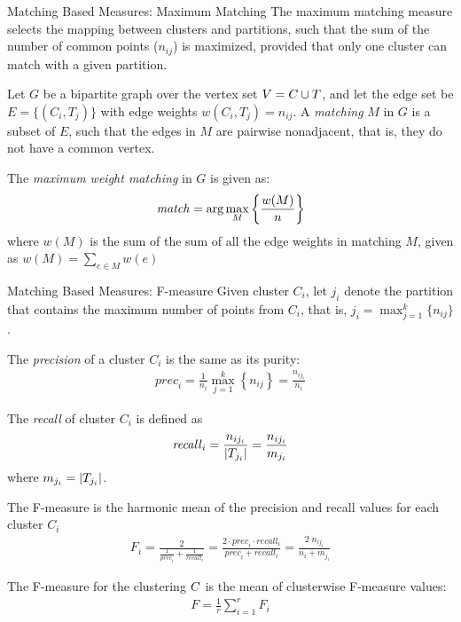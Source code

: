 \begin{frame}{Matching Based Measures: Maximum Matching}
The maximum matching
measure selects the mapping between clusters and partitions, such
that the sum of the number of common points ($n_{ij}$) is
maximized, provided that only one cluster can match with a given
partition.

\medskip
Let $G$ be a bipartite graph over the vertex set $V = {\relax C} \cup {\relax T}$, and
let the edge set be $E = \{ (C_i, T_{j}) \}$ with 
edge weights $w(C_i,T_{j}) = n_{ij}$.
A {\em matching} $M$ in $G$ is a subset of $E$, such that the edges in
$M$ are pairwise nonadjacent, that is, they do not have a common vertex.

\medskip
The {\em maximum weight matching} in $G$ is given as:
\begin{align*}
  \mathit{match} = \arg \max_M \left\{ \frac{w(M)}{n} \right\}
\end{align*}
where $w(M)$ is the sum of the sum of
all the edge weights in matching $M$, given as $w(M) = \sum_{e \in M} w(e)$
\end{frame}




\begin{frame}{Matching Based Measures: F-measure}
  \small
Given cluster $C_i$, let $j_i$ denote the
partition that contains the maximum number of points from $C_i$,
that is, $j_i = \max_{j=1}^k \{ n_{ij} \}$.  

\medskip
The {\em precision} of a
cluster $C_i$ is the same as its purity:
\begin{align*}
  \mathit{prec}_i = \frac{1}{n_{i}}\max_{j=1}^k \left\{ n_{ij} \right\} =
  \frac{n_{ij_i}}{n_i}
\end{align*}

\medskip
The {\em recall} of cluster $C_i$ is def\/{i}ned as
\begin{align*}
  \mathit{recall}_i = \frac{n_{ij_i}}{|T_{j_i}|} =\frac{n_{ij_i}}{m_{j_i}}
 \end{align*}
 where $m_{j_i} = |T_{j_i}|$.

\medskip
The F-measure is the harmonic mean of the precision and recall values for
each cluster $C_i$
\begin{align*}
  F_i = \frac{2}{\frac{1}{\mathit{prec}_i} + \frac{1}{\mathit{recall}_i}} =
  \frac{2 \cdot \mathit{prec}_i \cdot \mathit{recall}_i}{\mathit{prec}_i + \mathit{recall}_i} =
  \frac{2 \; n_{ij_i}}{n_{i} + m_{j_i}}
\end{align*}

\medskip
The F-measure for the clustering ${\relax C}$ is the mean of clusterwise
F-measure values:
\begin{align*}
  F = \frac{1}{r} \sum_{i=1}^r F_i
\end{align*}
\end{frame}




